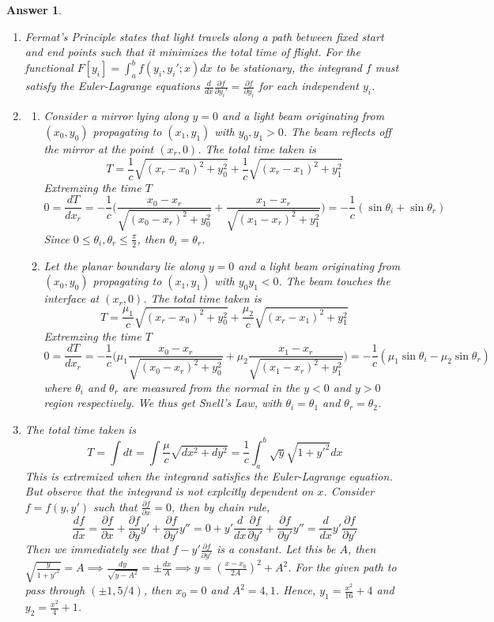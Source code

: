 \documentclass[a4paper]{article}
\newtheorem{ans}{Answer}[section]
\theoremstyle{new}
\begin{document}
\begin{ans}\leavevmode
\begin{enumerate}[label=(\alph*)]
\item Fermat's Principle states that light travels along a path between fixed start and end points such that it minimizes the total time of flight. For the functional $F[y_i]=\int_a^bf(y_i,y_i';x)dx$ to be stationary, the integrand $f$ must satisfy the Euler-Lagrange equations $\frac{d}{dx}\frac{\partial f}{\partial y_i'}=\frac{\partial f}{\partial y_i}$ for each independent $y_i$.
\item 
\begin{enumerate}[label=(\roman*)]
\item Consider a mirror lying along $y=0$ and a light beam originating from $(x_0,y_0)$ propagating to $(x_1,y_1)$ with $y_0,y_1>0$. The beam reflects off the mirror at the point $(x_r,0)$. The total time taken is
$$T=\frac{1}{c}\sqrt{(x_r-x_0)^2+y_0^2}+\frac{1}{c}\sqrt{(x_r-x_1)^2+y_1^2}$$
Extremzing the time $T$
$$0=\frac{dT}{dx_r}=-\frac{1}{c}\bigg(\frac{x_0-x_r}{\sqrt{(x_0-x_r)^2+y_0^2}}+\frac{x_1-x_r}{\sqrt{(x_1-x_r)^2+y_1^2}}\bigg)=-\frac{1}{c}(\sin\theta_i+\sin\theta_r)$$
Since $0\leq\theta_i,\theta_r\leq\frac{\pi}{2}$, then $\theta_i=\theta_r$.\item Let the planar boundary lie along $y=0$ and a light beam originating from $(x_0,y_0)$ propagating to $(x_1,y_1)$ with $y_0y_1<0$. The beam touches the interface at $(x_r,0)$. The total time taken is
$$T=\frac{\mu_1}{c}\sqrt{(x_r-x_0)^2+y_0^2}+\frac{\mu_2}{c}\sqrt{(x_r-x_1)^2+y_1^2}$$
Extremzing the time $T$
$$0=\frac{dT}{dx_r}=-\frac{1}{c}\bigg(\mu_1\frac{x_0-x_r}{\sqrt{(x_0-x_r)^2+y_0^2}}+\mu_2\frac{x_1-x_r}{\sqrt{(x_1-x_r)^2+y_1^2}}\bigg)=-\frac{1}{c}(\mu_1\sin\theta_i-\mu_2\sin\theta_r)$$
where $\theta_i$ and $\theta_r$ are measured from the normal in the $y<0$ and $y>0$ region respectively. We thus get Snell's Law, with $\theta_i=\theta_1$ and $\theta_r=\theta_2$.
\end{enumerate}
\item The total time taken is
$$T=\int dt=\int\frac{\mu}{c}\sqrt{dx^2+dy^2}=\frac{1}{c}\int_a^b\sqrt{y}\sqrt{1+y'^2}dx$$
This is extremized when the integrand satisfies the Euler-Lagrange equation. But observe that the integrand is not explcitly dependent on $x$. Consider $f=f(y,y')$ such that $\frac{\partial f}{\partial x}=0$, then by chain rule,
$$\frac{df}{dx}=\frac{\partial f}{\partial x}+\frac{\partial f}{\partial y}y'+\frac{\partial f}{\partial y'}y''=0+y'\frac{d}{dx}\frac{\partial f}{\partial y'}+\frac{\partial f}{\partial y'}y''=\frac{d}{dx}y'\frac{\partial f}{\partial y'}$$
Then we immediately see that $f-y'\frac{\partial f}{\partial y'} $ is a constant. Let this be $A$, then $\sqrt{\frac{y}{1+y'^2}}=A\implies\frac{dy}{\sqrt{y-A^2}}=\pm\frac{dx}{A}\implies y=(\frac{x-x_0}{2A})^2+A^2$. For the given path to pass through $(\pm1,5/4)$, then $x_0=0$ and $A^2=4,1$. Hence, $y_1=\frac{x^2}{16}+4$ and $y_2=\frac{x^2}{4}+1$.
\end{enumerate}
\end{ans}
\end{document}
